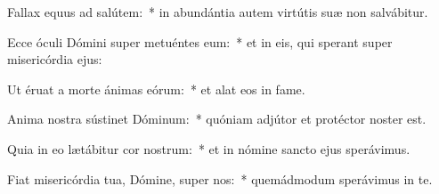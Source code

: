 \item Fallax equus ad salútem:~* in abundántia autem virtútis suæ non salvábitur.

\item Ecce óculi Dómini super metuéntes eum:~* et in eis, qui sperant super misericórdia ejus:

\item Ut éruat a morte ánimas eórum:~* et alat eos in fame.

\item Anima nostra sústinet Dóminum:~* quóniam adjútor et protéctor noster est.

\item Quia in eo lætábitur cor nostrum:~* et in nómine sancto ejus sperávimus.

\item Fiat misericórdia tua, Dómine, super nos:~* quemádmodum sperávimus in te.

